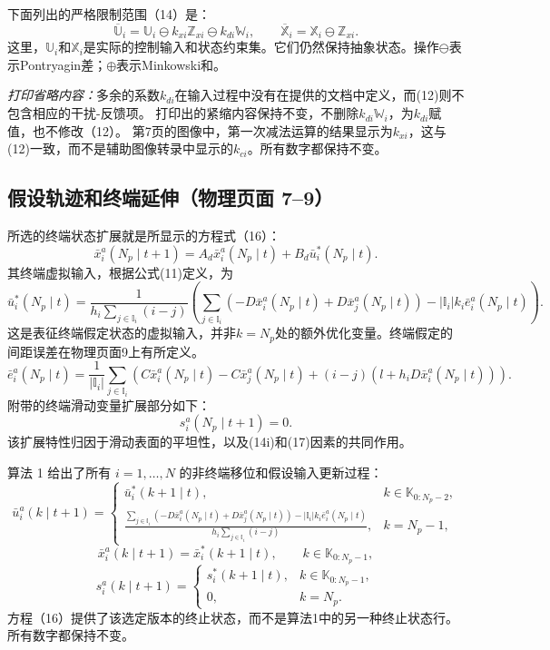 \documentclass{article}
\begin{document}
下面列出的严格限制范围（14）是：
\[
\boxed{\quad
\overline{\mathbb U}_i
=\mathbb U_i\ominus k_{xi}\mathbb Z_{xi}\ominus k_{di}\mathbb W_i,
\qquad
\overline{\mathbb X}_i=\mathbb X_i\ominus\mathbb Z_{xi}.
\quad}
\]
这里，$\mathbb U_i$和$\mathbb X_i$是实际的控制输入和状态约束集。它们仍然保持抽象状态。操作$\ominus$表示Pontryagin差；$\oplus$表示Minkowski和。

\emph{打印省略内容：}多余的系数$k_{di}$在输入过程中没有在提供的文档中定义，而(12)则不包含相应的干扰-反馈项。 打印出的紧缩内容保持不变，不删除$k_{di}\mathbb W_i$，为$k_{di}$赋值，也不修改（12）。 第7页的图像中，第一次减法运算的结果显示为$k_{xi}$，这与(12)一致，而不是辅助图像转录中显示的$k_{ci}$。所有数字都保持不变。

\subsection*{假设轨迹和终端延伸（物理页面 7–9）}
所选的终端状态扩展就是所显示的方程式（16）：
\begin{equation}
\bar x_i^a(N_p\mid t+1)
=A_d\bar x_i^a(N_p\mid t)+B_d\bar u_i^*(N_p\mid t).
\tag{16}
\end{equation}
其终端虚拟输入，根据公式(11)定义，为
\begin{equation}
\bar u_i^*(N_p\mid t)=
\frac{1}{\displaystyle h_i\sum_{j\in\mathbb I_i}(i-j)}
\left(
\sum_{j\in\mathbb I_i}
\left(-D\bar x_i^a(N_p\mid t)+D\bar x_j^a(N_p\mid t)\right)
-|\mathbb I_i|k_i\bar e_i^a(N_p\mid t)
\right).
\tag{17}
\end{equation}
这是表征终端假定状态的虚拟输入，并非$k=N_p$处的额外优化变量。终端假定的间距误差在物理页面9上有所定义。
\[
\bar e_i^a(N_p\mid t)=\frac{1}{|\mathbb I_i|}\sum_{j\in\mathbb I_i}
\left(C\bar x_i^a(N_p\mid t)-C\bar x_j^a(N_p\mid t)
 +(i-j)\left(l+h_iD\bar x_i^a(N_p\mid t)\right)\right).
\]
附带的终端滑动变量扩展部分如下：
\[
s_i^a(N_p\mid t+1)=0.
\]
该扩展特性归因于滑动表面的平坦性，以及(14i)和(17)因素的共同作用。

算法 1 给出了所有 $i=1,\ldots,N$ 的非终端移位和假设输入更新过程：
\[
\bar u_i^a(k\mid t+1)=
\begin{cases}
\bar u_i^*(k+1\mid t),&k\in\mathbb K_{0:N_p-2},\\[3pt]
\displaystyle
\frac{\sum_{j\in\mathbb I_i}\left(-D\bar x_i^a(N_p\mid t)+D\bar x_j^a(N_p\mid t)\right)
-|\mathbb I_i|k_i\bar e_i^a(N_p\mid t)}
{h_i\sum_{j\in\mathbb I_i}(i-j)},&k=N_p-1,
\end{cases}
\]
\[
\bar x_i^a(k\mid t+1)=\bar x_i^*(k+1\mid t),
\qquad k\in\mathbb K_{0:N_p-1},
\]
\[
s_i^a(k\mid t+1)=
\begin{cases}
s_i^*(k+1\mid t),&k\in\mathbb K_{0:N_p-1},\\
0,&k=N_p.
\end{cases}
\]
方程（16）提供了该选定版本的终止状态，而不是算法1中的另一种终止状态行。所有数字都保持不变。
\end{document}
